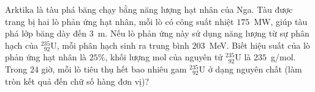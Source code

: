 	\begin{ex}%
		Arktika là tàu phá băng chạy bằng năng lượng hạt nhân của Nga. Tàu được trang bị hai lò phản ứng hạt nhân, mỗi lò có công suất nhiệt $175$~MW, giúp tàu phá lớp băng dày đến $3$~m. Nếu lò phản ứng này sử dụng năng lượng từ sự phân hạch của $^{235}_{\phantom{2}92}\text{U}$, mỗi phân hạch sinh ra trung bình $203$~MeV. Biết hiệu suất của lò phản ứng hạt nhân là $25\%$, khối lượng mol của nguyên tử $^{235}_{\phantom{2}92}\text{U}$ là $235$~g/mol. Trong $24$ giờ, mỗi lò tiêu thụ hết bao nhiêu gam $^{235}_{\phantom{2}92}\text{U}$ ở dạng nguyên chất (làm tròn kết quả đến chữ số hàng đơn vị)?
		\par
	\end{ex}

